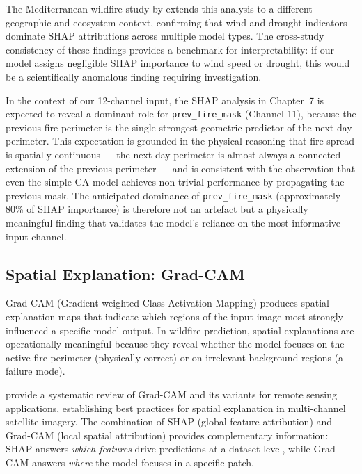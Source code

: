 The Mediterranean wildfire study by \citet{xai2022wildfire} extends this analysis to a different geographic and ecosystem context, confirming that wind and drought indicators dominate SHAP attributions across multiple model types.
The cross-study consistency of these findings provides a benchmark for interpretability: if our model assigns negligible SHAP importance to wind speed or drought, this would be a scientifically anomalous finding requiring investigation.

In the context of our 12-channel input, the SHAP analysis in Chapter~7 is expected to reveal a dominant role for \texttt{prev\_fire\_mask} (Channel 11), because the previous fire perimeter is the single strongest geometric predictor of the next-day perimeter.
This expectation is grounded in the physical reasoning that fire spread is spatially continuous — the next-day perimeter is almost always a connected extension of the previous perimeter — and is consistent with the observation that even the simple CA model achieves non-trivial performance by propagating the previous mask.
The anticipated dominance of \texttt{prev\_fire\_mask} (approximately 80\% of SHAP importance) is therefore not an artefact but a physically meaningful finding that validates the model's reliance on the most informative input channel.

\subsection{Spatial Explanation: Grad-CAM}

Grad-CAM (Gradient-weighted Class Activation Mapping) \citep{selvaraju2017gradcam} produces spatial explanation maps that indicate which regions of the input image most strongly influenced a specific model output.
In wildfire prediction, spatial explanations are operationally meaningful because they reveal whether the model focuses on the active fire perimeter (physically correct) or on irrelevant background regions (a failure mode).

\citet{xaireview2024} provide a systematic review of Grad-CAM and its variants for remote sensing applications, establishing best practices for spatial explanation in multi-channel satellite imagery.
The combination of SHAP (global feature attribution) and Grad-CAM (local spatial attribution) provides complementary information: SHAP answers \emph{which features} drive predictions at a dataset level, while Grad-CAM answers \emph{where} the model focuses in a specific patch.

